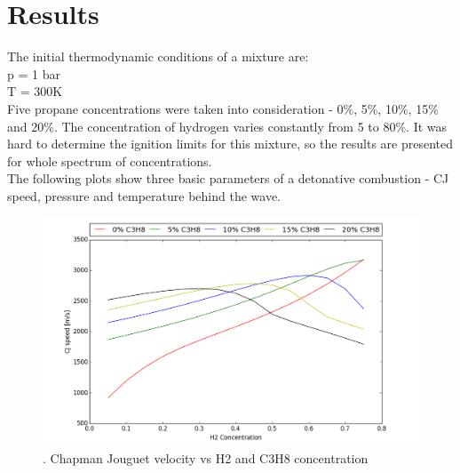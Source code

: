 \documentclass[11pt,a4paper]{article}
\begin{document}
\section{Results}\label{sec:results}
The initial thermodynamic conditions of a mixture are:\\
p = 1 bar\\
T = 300K\\

Five propane concentrations were taken into consideration - 0\%, 5\%, 10\%, 15\% and 20\%. The concentration of hydrogen varies constantly from 5 to 80\%. It was hard to determine the ignition limits for this mixture, so the results are presented for whole spectrum of concentrations.\\
The following plots show three basic parameters of a detonative combustion - CJ speed, pressure and temperature behind the wave.



\begin{figure}[t]
    \centering
    \includegraphics[width=1.2\textwidth]{plot_CJ}
    \caption{.         Chapman Jouguet velocity vs H2 and C3H8 concentration}
    \label{fig:CJ}
\end{figure}
\end{document}
